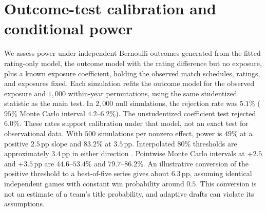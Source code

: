 \documentclass[11pt]{article}
\newcommand{\pp}{\,pp}
\begin{document}
\FloatBarrier
\section{Outcome-test calibration and conditional power}
\label{app:power}
We assess power under independent Bernoulli outcomes generated from the fitted rating-only model, the outcome model with the rating difference but no exposure, plus a known exposure coefficient, holding the observed match schedules, ratings, and exposures fixed. Each simulation refits the outcome model for the observed exposure and $1{,}000$ within-year permutations, using the same studentized statistic as the main test. In $2{,}000$ null simulations, the rejection rate was $5.1\%$ ($95\%$ Monte Carlo interval $4.2$--$6.2\%$). The unstudentized coefficient test rejected $6.0\%$. These rates support calibration under that model, not an exact test for observational data. With $500$ simulations per nonzero effect, power is $49\%$ at a positive $2.5$\pp{} slope and $83.2\%$ at $3.5$\pp{}. Interpolated $80\%$ thresholds are approximately $3.4$\pp{} in either direction \citep{bloom1995}. Pointwise Monte Carlo intervals at $+2.5$ and $+3.5$\pp{} are $44.6$--$53.4\%$ and $79.7$--$86.2\%$. An illustrative conversion of the positive threshold to a best-of-five series gives about $6.3$\pp{}, assuming identical independent games with constant win probability around $0.5$. This conversion is not an estimate of a team's title probability, and adaptive drafts can violate its assumptions.
\end{document}
